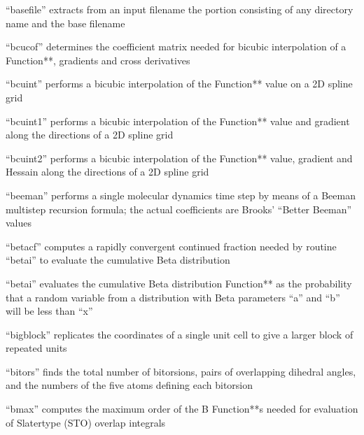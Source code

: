 \documentclass[letterpaper,11pt,english]{sphinxmanual}
\begin{document}
“basefile” extracts from an input filename the portion consisting of any directory name and the base filename


“bcucof” determines the coefficient matrix needed for bicubic interpolation of a Function**, gradients and cross derivatives


“bcuint” performs a bicubic interpolation of the Function** value on a 2D spline grid


“bcuint1” performs a bicubic interpolation of the Function** value and gradient along the directions of a 2D spline grid


“bcuint2” performs a bicubic interpolation of the Function** value, gradient and Hessain along the directions of a 2D spline grid


“beeman” performs a single molecular dynamics time step by means of a Beeman multistep recursion formula; the actual coefficients are Brooks’ “Better Beeman” values


“betacf” computes a rapidly convergent continued fraction needed by routine “betai” to evaluate the cumulative Beta distribution


“betai” evaluates the cumulative Beta distribution Function** as the probability that a random variable from a distribution with Beta parameters “a” and “b” will be less than “x”


“bigblock” replicates the coordinates of a single unit cell to give a larger block of repeated units


“bitors” finds the total number of bitorsions, pairs of overlapping dihedral angles, and the numbers of the five atoms defining each bitorsion


“bmax” computes the maximum order of the B Function**s needed for evaluation of Slater\sphinxhyphen{}type (STO) overlap integrals
\end{document}
